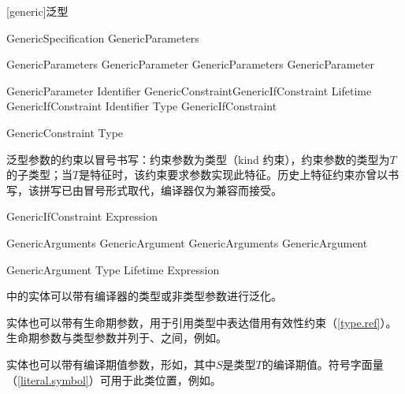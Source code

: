 
[generic]{泛型}

\begin{bnf}{GenericSpecification}
    \terminal{<} GenericParameters \terminal{>}
\end{bnf}

\begin{bnf}{GenericParameters}
    GenericParameter \br
    GenericParameters \terminal{,} GenericParameter
\end{bnf}

\begin{bnf}{GenericParameter}
    Identifier \bnfq GenericConstraint\bnfq GenericIfConstraint\bnfq \br
    Lifetime GenericIfConstraint\bnfq \br
     Identifier \terminal{:} Type GenericIfConstraint\bnfq
\end{bnf}

\begin{bnf}{GenericConstraint}
    \terminal{:}  \br
    \terminal{:} Type
\end{bnf}

\pnum
泛型参数的约束以冒号书写：约束参数为类型（kind 约束），约束参数的类型为$T$的子类型；当$T$是特征时，该约束要求参数实现此特征。历史上特征约束亦曾以书写，该拼写已由冒号形式取代，编译器仅为兼容而接受。

\begin{bnf}{GenericIfConstraint}
     Expression
\end{bnf}

\begin{bnf}{GenericArguments}
    GenericArgument \br
    GenericArguments \terminal{,} GenericArgument
\end{bnf}

\begin{bnf}{GenericArgument}
    Type \br
    Lifetime \br
    Expression
\end{bnf}

\pnum
\X 中的实体可以带有编译器的类型或非类型参数进行泛化。

\pnum
实体也可以带有生命期参数，用于引用类型中表达借用有效性约束（\ref{type.ref}）。生命期参数与类型参数并列于\tcode{<}、\tcode{>}之间，例如。

\pnum
实体也可以带有编译期值参数，形如，其中$S$是类型$T$的编译期值。符号字面量（\ref{literal.symbol}）可用于此类位置，例如。

